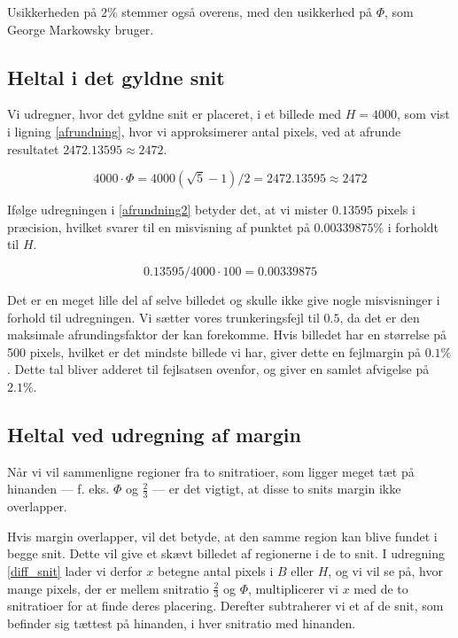 {Usikkerheden på $2\%$ stemmer også overens, med den usikkerhed
på $\varPhi$, som George Markowsky bruger\cite{Markowsky1992}.

\subsection{Heltal i det gyldne snit}
Vi udregner, hvor det gyldne snit er placeret, i et billede med $H =
4000$, som vist i ligning \eqref{afrundning}, hvor vi approksimerer
antal pixels, ved at afrunde resultatet $2472.13595 \approx 2472$.

\begin{equation}
    4000 \cdot \varPhi = 4000(\sqrt{5}-1)/2 = 2472.13595 \approx 2472 \label{afrundning}
\end{equation}

Ifølge udregningen i \eqref{afrundning2} betyder det, at vi mister
$0.13595$ pixels i præcision, hvilket svarer til en misvisning af
punktet på $0.00339875\%$ i forholdt til $H$.

\begin{equation}
    0.13595/4000 \cdot 100 = 0.00339875 \label{afrundning2}
\end{equation}

Det er en meget lille del af selve billedet og skulle ikke give nogle
misvisninger i forhold til udregningen. Vi sætter vores trunkeringsfejl
til $0.5$, da det er den maksimale afrundingsfaktor der kan forekomme.
Hvis billedet har en størrelse på 500 pixels, hvilket er det mindste
billede vi har, giver dette en fejlmargin på $0.1 \%$. Dette tal bliver
adderet til fejlsatsen ovenfor, og giver en samlet afvigelse på $2.1\%$.

\subsection{Heltal ved udregning af margin}
Når vi vil sammenligne regioner fra to snitratioer,  som
ligger meget tæt på hinanden --- f. eks.  $\varPhi$ og $\frac{2}{3}$ ---
er det vigtigt, at disse to snits margin ikke overlapper.

Hvis margin overlapper, vil det betyde, at den samme region kan blive
fundet i begge snit. Dette vil give et skævt billedet af regionerne i de
to snit.  I udregning \ref{diff_snit} lader vi derfor $x$ betegne
antal pixels i $B$ eller $H$, og vi vil se på, hvor mange pixels, der er
mellem snitratio $\frac{2}{3}$ og $\varPhi$, multiplicerer vi $x$ med de
to snitratioer for at finde deres placering.  Derefter subtraherer vi et
af de snit, som befinder sig tættest på hinanden, i hver snitratio med
hinanden.

}

